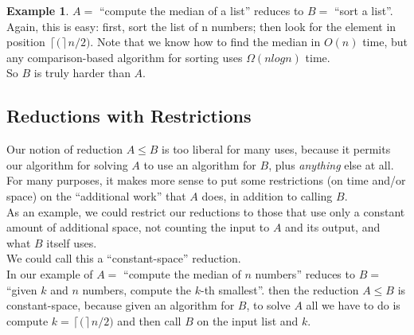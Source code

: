 \documentclass[12pt]{article}
\theoremstyle{plain}
\theoremstyle{definition}
\newtheorem*{ex*}{Example}
\newcommand{\ceil}[1]{\ensuremath{\left\lceil #1 \right\rceil}}
\begin{document}
\begin{ex*}
$A =$ ``compute the median of a list'' reduces to $B =$ ``sort a list''. \\
Again, this is easy: first, sort the list of n numbers;
then look for the element in position $\ceil(n/2)$.
Note that we know how to find the median in $O(n)$ time, but any comparison-based algorithm for sorting uses $\Omega(n log n)$ time. \\
So $B$ is truly harder than $A$.
\end{ex*}

\subsection{Reductions with Restrictions}
Our notion of reduction $A \leq B$ is too liberal for many uses, because it permits our algorithm for solving $A$ to use an algorithm for $B$, plus \emph{anything} else at all. \\
For many purposes, it makes more sense to put some restrictions (on time and/or space) on the ``additional work'' that $A$ does, in addition to calling $B$. \\

As an example, we could restrict our reductions to those that use only a constant amount of additional space, not counting the input to $A$ and its output, and what $B$ itself uses. \\
We could call this a ``constant-space'' reduction. \\
In our example of $A =$ ``compute the median of $n$ numbers'' reduces to $B =$ ``given $k$ and $n$ numbers, compute the $k$-th smallest''. then the reduction $A \leq B$ is constant-space, because given an algorithm for $B$, to solve $A$ all we have to do is compute $k = \ceil(n/2)$ and then call $B$ on the input list and $k$.


\clearpage
\printindex
\end{document}
